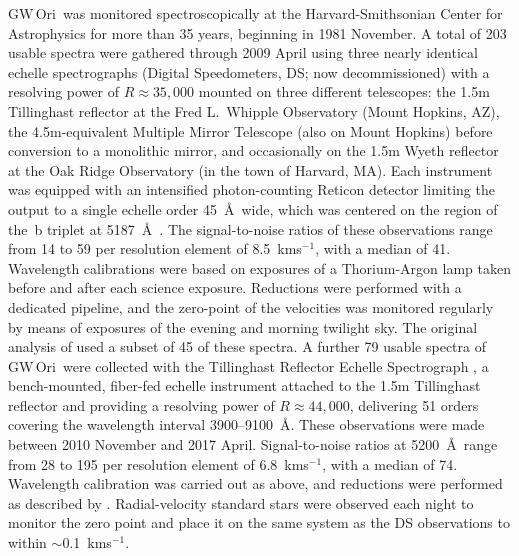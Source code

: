\documentclass[twocolumn]{aastex61}
\newcommand\kms{\ifmmode{\rm km\thinspace s^{-1}}\else km\thinspace s$^{-1}$\fi}
\newcommand{\gw}{GW\,Ori}
\begin{document}
\gw\ was monitored spectroscopically at the Harvard-Smithsonian Center for Astrophysics for more than 35 years, beginning in 1981 November. A total of 203 usable spectra were gathered through 2009 April using three nearly identical echelle spectrographs (Digital Speedometers, DS; now decommissioned) with a resolving power of $R \approx 35,000$ mounted on three different telescopes: the 1.5m Tillinghast reflector at the Fred L.\ Whipple Observatory (Mount Hopkins, AZ), the 4.5m-equivalent Multiple Mirror Telescope (also on Mount Hopkins) before conversion to a monolithic mirror, and occasionally on the 1.5m Wyeth reflector at the Oak Ridge Observatory (in the town of Harvard, MA).  Each instrument was equipped with an intensified photon-counting Reticon detector limiting the output to a single echelle order 45~\AA\ wide, which was centered on the region of the \,b triplet at 5187~\AA\ \citep[see][]{latham92}. The signal-to-noise ratios of these observations range from 14 to 59 per resolution element of 8.5~\kms, with a median of 41. Wavelength calibrations were based on exposures of a Thorium-Argon lamp taken before and after each science exposure. Reductions were performed with a dedicated pipeline, and the zero-point of the velocities was monitored regularly by means of exposures of the evening and morning twilight sky. The original analysis of \cite{mathieu91} used a subset of 45 of these spectra. A further 79 usable spectra of \gw\ were collected with the Tillinghast Reflector Echelle Spectrograph \citep[TRES;][]{furesz08}, a bench-mounted, fiber-fed echelle instrument attached to the 1.5m Tillinghast reflector and providing a resolving power of $R \approx 44,000$, delivering 51 orders covering the wavelength interval 3900--9100~\AA. These observations were made between 2010 November and 2017 April.  Signal-to-noise ratios at 5200~\AA\ range from 28 to 195 per resolution element of 6.8~\kms, with a median of 74. Wavelength calibration was carried out as above, and reductions were performed as described by \cite{buchhave10}. Radial-velocity standard stars were observed each night to monitor the zero point and place it on the same system as the DS observations to within $\sim$0.1~\kms.
\end{document}

